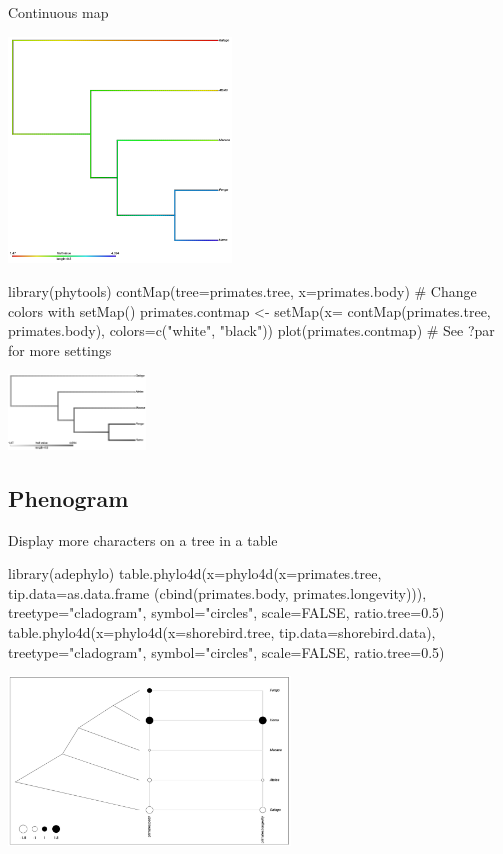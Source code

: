 \documentclass[compress, ucs, xelatex, 11pt, xcolor=svgnames,
  hyperref={
    bookmarks=true,
    unicode=true,
    colorlinks=true,
    pdftitle={Molecular data in R},
    plainpages=false,
    pdfauthor={Vojtech Zeisek},
    pdfsubject={Course about phylogeny and evolution in R},
    pdfcreator={XeLaTeX},
    pdfkeywords={R, evolution, phylogeny, molecular data},
    linkcolor=Tomato,
    anchorcolor=SaddleBrown,
    citecolor=Goldenrod,
    filecolor=DarkMagenta,
    menucolor=Sienna,
    urlcolor=DarkTurquoise,
    pdftex},
  url={hyphens, lowtilde} %
  ]{beamer}
\begin{document}
\begin{frame}[fragile]{Continuous map}
\begin{multicols}{2}
  \includegraphics[height=6cm]{contmap.png}
  \begin{spluscode}
    library(phytools)
    contMap(tree=primates.tree,
      x=primates.body)
    # Change colors with setMap()
    primates.contmap <- setMap(x=
      contMap(primates.tree,
      primates.body),
      colors=c("white", "black"))
    plot(primates.contmap)
    # See ?par for more settings
  \end{spluscode}
  \begin{center}
    \includegraphics[height=2cm]{contmapbw.png}
  \end{center}
\end{multicols}
\end{frame}

\subsection{Phenogram}

\begin{frame}[fragile]{Display more characters on a tree in a table}
  \begin{spluscode}
    library(adephylo)
    table.phylo4d(x=phylo4d(x=primates.tree, tip.data=as.data.frame
      (cbind(primates.body, primates.longevity))), treetype="cladogram",
      symbol="circles", scale=FALSE, ratio.tree=0.5)
    table.phylo4d(x=phylo4d(x=shorebird.tree, tip.data=shorebird.data),
      treetype="cladogram", symbol="circles", scale=FALSE, ratio.tree=0.5)
  \end{spluscode}
  \begin{center}
    \includegraphics[height=4.5cm]{phylotable.png}
  \end{center}
\end{frame}
\end{document}
